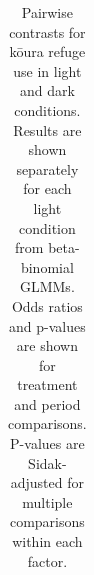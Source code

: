 \documentclass[
  12pt,
  a4paper,
]{scrbook}
\begin{document}
{

\begin{longtable}[]{@{}
  >{\raggedright\arraybackslash}p{}
  >{\raggedright\arraybackslash}p{}
  >{\raggedleft\arraybackslash}p{}
  >{\raggedleft\arraybackslash}p{}
  >{\raggedleft\arraybackslash}p{}
  >{\raggedleft\arraybackslash}p{}
  >{\raggedleft\arraybackslash}p{}
  >{\raggedleft\arraybackslash}p{}@{}}

\caption{\label{tbl-emmeans-stratified}Pairwise contrasts for kōura
refuge use in light and dark conditions. Results are shown separately
for each light condition from beta-binomial GLMMs. Odds ratios and
p-values are shown for treatment and period comparisons. P-values are
Sidak-adjusted for multiple comparisons within each factor.}

\tabularnewline


\end{longtable}}
\end{document}
